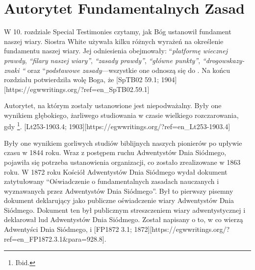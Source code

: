 \chapter{Autorytet Fundamentalnych Zasad} \label{chap:authority}

W 10. rozdziale Special Testimonies czytamy, jak Bóg ustanowił fundament naszej wiary. Siostra White używała kilku różnych wyrażeń na określenie fundamentu naszej wiary. Jej odniesienia obejmowały: “\textit{platformę wiecznej prawdy}, \textit{“filary naszej wiary”}, \textit{“zasady prawdy”}, \textit{“główne punkty”}, \textit{“drogowskazy- znaki “} oraz “\textit{podstawowe zasady}—wszystkie one odnoszą się do . Na końcu rozdziału potwierdziła wolę Boga, że [SpTB02 59.1; 1904][https://egwwritings.org/?ref=en\_SpTB02.59.1]

Autorytet, na którym zostały ustanowione  jest niepodważalny. Były one wynikiem głębokiego, żarliwego studiowania w czasie wielkiego rozczarowania, gdy \footnote{Ibid.}. [Lt253-1903.4; 1903][https://egwwritings.org/?ref=en\_Lt253-1903.4]

Były one wynikiem gorliwych studiów biblijnych naszych pionierów po upływie czasu w 1844 roku. Wraz z postępem ruchu Adwentystów Dnia Siódmego, pojawiła się potrzeba ustanowienia organizacji, co zostało zrealizowane w 1863 roku. W 1872 roku Kościół Adwentystów Dnia Siódmego wydał dokument zatytułowany “Oświadczenie o fundamentalnych zasadach nauczanych i wyznawanych przez Adwentystów Dnia Siódmego”. Był to pierwszy pisemny dokument deklarujący  jako publiczne oświadczenie wiary Adwentystów Dnia Siódmego. Dokument ten był publicznym streszczeniem wiary adwentystycznej i deklarował  lud Adwentystów Dnia Siódmego. Został napisany  o to, w co wierzą Adwentyści Dnia Siódmego,  i [FP1872 3.1; 1872][https://egwwritings.org/?ref=en\_FP1872.3.1&para=928.8].

